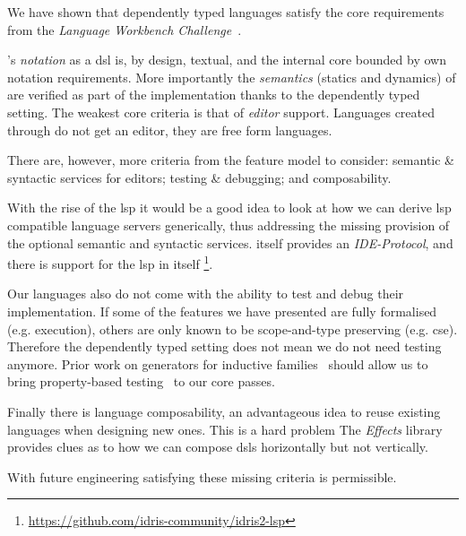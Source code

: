 
We have shown that dependently typed languages satisfy the core requirements from the \emph{Language Workbench Challenge}~\cite{DBLP:conf/sle/ErdwegSVBBCGHKLKMPPSSSVVVWW13}.

\Velo{}'s \emph{notation} as a \ac{dsl} is, by design, textual, and the internal core bounded by \Idris{} own notation requirements.
%
More importantly the \emph{semantics} (statics and dynamics) of \Velo{}
are verified as part of the implementation thanks to the dependently typed setting.
%
The weakest core criteria is that of \emph{editor} support.
%
Languages created through \Idris{} do not get an editor, they are free form languages.

%
There are, however, more criteria from the feature model to consider:
%
semantic \& syntactic services for editors;
%
testing \& debugging;
%
and
%
composability.
%

With the rise of the \ac{lsp} it would be a good idea to look at how we can derive \ac{lsp} compatible language servers generically, thus addressing the missing provision of the optional semantic and syntactic services.
\Idris{} itself provides an \emph{IDE-Protocol}, and there is support for the \ac{lsp} in \Idris{} itself
\footnote{\url{https://github.com/idris-community/idris2-lsp}}.



Our languages also do not come with the ability to test and debug their
implementation.
%
If some of the features we have presented are fully formalised (e.g. execution),
others are only known to be scope-and-type preserving (e.g. \ac{cse}).
%
Therefore the dependently typed setting does not mean we do not need testing
anymore.
%
Prior work on generators for inductive families~\cite{DBLP:journals/pacmpl/LampropoulosPP18}
should allow us to bring property-based testing~\cite{DBLP:conf/icfp/ClaessenH00} to our core passes.

Finally there is language composability, an advantageous idea to reuse existing languages when designing new ones.
This is a hard problem
The \emph{Effects} library~\cite{DBLP:conf/icfp/Brady13} provides clues as to how we can compose \acp{dsl} horizontally but not vertically.

With future engineering satisfying these missing criteria is permissible.


